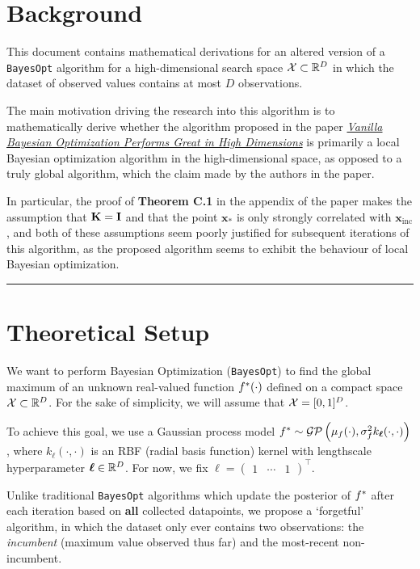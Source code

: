 \documentclass[11pt]{article}
\def\BayesOpt{\texttt{BayesOpt}}
\def\calGP{\mathcal{GP}}
\newcommand{\bs}[1]{\boldsymbol{#1}}
\def\bsx{\bs{x}}
\def\bell{\bs{\ell}}
\begin{document}
\section{Background}

This document contains mathematical derivations for an altered version of a \BayesOpt{} algorithm for a high-dimensional search space $\mathcal{X} \subset \mathbb{R}^{D}$ in which the dataset of observed values contains at most $D$ observations.

The main motivation driving the research into this algorithm is to mathematically derive whether the algorithm proposed in the paper \href{https://arxiv.org/abs/2402.02229}{\textit{Vanilla Bayesian Optimization Performs Great in High Dimensions}} is primarily a local Bayesian optimization algorithm in the high-dimensional space, as opposed to a truly global algorithm, which the claim made by the authors in the paper. 

In particular, the proof of \textbf{Theorem C.1} in the appendix of the paper makes the assumption that $\mathbf{K} = \mathbf{I}$ and that the point $\bsx_{*}$ is only strongly correlated with $\bsx_{\textrm{inc}}$, and both of these assumptions seem poorly justified for subsequent iterations of this algorithm, as the proposed algorithm seems to exhibit the behaviour of local Bayesian optimization.

\noindent\rule{\textwidth}{0.8pt}
\section{Theoretical Setup}

We want to perform Bayesian Optimization (\BayesOpt) to find the global maximum of an unknown real-valued function $f^{*}(\cdot)$ defined on a compact space $\mathcal{X} \subset \mathbb{R}^{D}$. For the sake of simplicity, we will assume that $\mathcal{X} = [0,1]^{D}$.

To achieve this goal, we use a Gaussian process model $\fstar \sim \calGP\left(\mu_{f}(\cdot), \sigma_{f}^{2}k_{\bell}(\cdot, \cdot)\right)$, where $k_{\bell}(\cdot, \cdot)$ is an RBF (radial basis function) kernel with lengthscale hyperparameter $\bell \in \bbR^{D}$. For now, we fix $\bell = \begin{pmatrix}1 & \cdots & 1\end{pmatrix}^{\top}$.

Unlike traditional \BayesOpt{} algorithms which update the posterior of $f^{*}$ after each iteration based on \textbf{all} collected datapoints, we propose a `forgetful' algorithm, in which the dataset only ever contains two observations: the \textit{incumbent} (maximum value observed thus far) and the most-recent non-incumbent.
\end{document}
